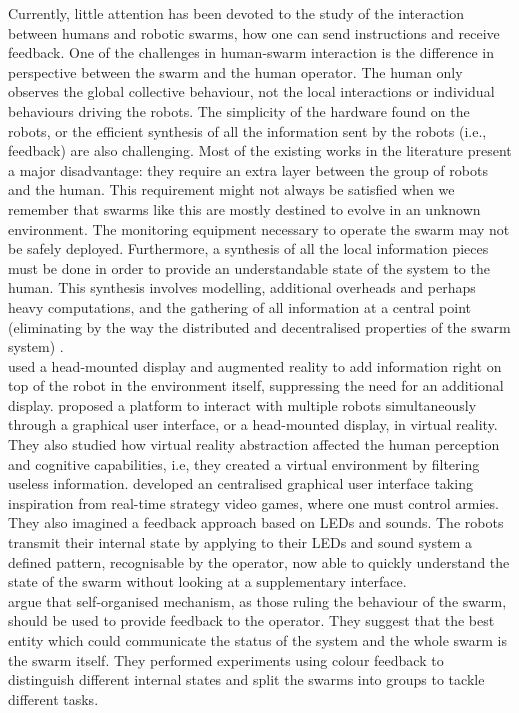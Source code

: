\documentclass[oneside, a4paper, 12pt]{memoir}
\begin{document}
	Currently, little attention has been devoted to the study of the interaction between humans and robotic swarms, how one can send instructions and receive feedback. One of the challenges in human-swarm interaction is the difference in perspective between the swarm and the human operator. The human only observes the global collective behaviour, not the local interactions or individual behaviours driving the robots. The simplicity of the hardware found on the robots, or the efficient synthesis of all the information sent by the robots (i.e., feedback) are also challenging. Most of the existing works in the literature present a major disadvantage: they require an extra layer between the group of robots and the human. This requirement might not always be satisfied when we remember that swarms like this are mostly destined to evolve in an unknown environment. The monitoring equipment necessary to operate the swarm may not be safely deployed. Furthermore, a synthesis of all the local information pieces must be done in order to provide an understandable state of the system to the human. This synthesis involves modelling, additional overheads and perhaps heavy computations, and the gathering of all information at a central point (eliminating by the way the distributed and decentralised properties of the swarm system) \citep{podevijn2012self}.\\
	\citet{daily2003world} used a head-mounted display and augmented reality to add information right on top of the robot in the environment itself, suppressing the need for an additional display. \citet{baizid2009human} proposed a platform to interact with multiple robots simultaneously through a graphical user interface, or a head-mounted display, in virtual reality. They also studied how virtual reality abstraction affected the human perception and cognitive capabilities, i.e, they created a virtual environment by filtering useless information. \citet{mclurkin2006speaking} developed an centralised graphical user interface taking inspiration from real-time strategy video games, where one must control armies. They also imagined a feedback approach based on LEDs and sounds. The robots transmit their internal state by applying to their LEDs and sound system a defined pattern, recognisable by the operator, now able to quickly understand the state of the swarm without looking at a supplementary interface.\\
	\citet{podevijn2012self} argue that self-organised mechanism, as those ruling the behaviour of the swarm, should be used to provide feedback to the operator. They suggest that the best entity which could communicate the status of the system and the whole swarm is the swarm itself. They performed experiments using colour feedback to distinguish different internal states and split the swarms into groups to tackle different tasks.\\
\end{document}
